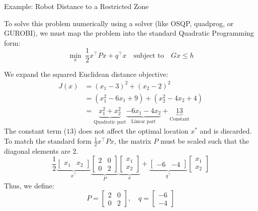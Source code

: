 \begin{examplebox}{Example: Robot Distance to a Restricted Zone}
\begin{center}
		\label{fig:qp_distance}
	\end{center}
	
	To solve this problem numerically using a solver (like OSQP, quadprog, or GUROBI), we must map the problem into the standard Quadratic Programming form:
	\begin{equation}
		\min_{x} \; \frac{1}{2} x^\top P x + q^\top x \quad \text{subject to} \quad Gx \leq h
	\end{equation}
	
	
	We expand the squared Euclidean distance objective:
	\begin{align*}
		J(x) &= (x_1 - 3)^2 + (x_2 - 2)^2 \\
		&= (x_1^2 - 6x_1 + 9) + (x_2^2 - 4x_2 + 4) \\
		&= \underbrace{x_1^2 + x_2^2}_{\text{Quadratic part}} \underbrace{- 6x_1 - 4x_2}_{\text{Linear part}} + \underbrace{13}_{\text{Constant}}
	\end{align*}
	The constant term ($13$) does not affect the optimal location $x^*$ and is discarded. To match the standard form $\frac{1}{2} x^\top P x$, the matrix $P$ must be scaled such that the diagonal elements are 2.
	\[
	\frac{1}{2} \underbrace{\begin{bmatrix} x_1 & x_2 \end{bmatrix}}_{x^\top}
	\underbrace{\begin{bmatrix} 2 & 0 \\ 0 & 2 \end{bmatrix}}_{P} 
	\underbrace{\begin{bmatrix} x_1 \\ x_2 \end{bmatrix}}_{x}
	+ 
	\underbrace{\begin{bmatrix} -6 & -4 \end{bmatrix}}_{q^\top} 
	\begin{bmatrix} x_1 \\ x_2 \end{bmatrix}
	\]
	Thus, we define:
	\[
	P = \begin{bmatrix} 2 & 0 \\ 0 & 2 \end{bmatrix}, \quad 
	q = \begin{bmatrix} -6 \\ -4 \end{bmatrix}
	\]
	

\end{examplebox}
